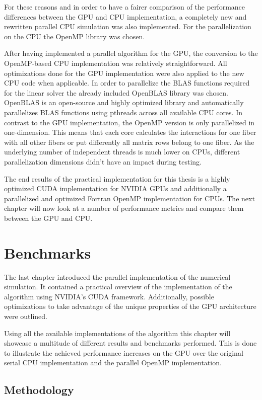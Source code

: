 \documentclass[a4paper,11pt]{kth-mag}
\begin{document}
For these reasons and in order to have a fairer comparison of the performance differences between the GPU and CPU implementation, a completely new and rewritten parallel CPU simulation was also implemented. For the parallelization on the CPU the OpenMP library was chosen.

After having implemented a parallel algorithm for the GPU, the conversion to the OpenMP-based CPU implementation was relatively straightforward. All optimizations done for the GPU implementation were also applied to the new CPU code when applicable. In order to parallelize the BLAS functions required for the linear solver the already included OpenBLAS library was chosen. OpenBLAS is an open-source and highly optimized library and automatically parallelizes BLAS functions using pthreads across all available CPU cores. In contrast to the GPU implementation, the OpenMP version is only parallelized in one-dimension. This means that each core calculates the interactions for one fiber with all other fibers or put differently all matrix rows belong to one fiber. As the underlying number of independent threads is much lower on CPUs, different parallelization dimensions didn't have an impact during testing.

The end results of the practical implementation for this thesis is a highly optimized CUDA implementation for NVIDIA GPUs and additionally a parallelized and optimized Fortran OpenMP implementation for CPUs. The next chapter will now look at a number of performance metrics and compare them between the GPU and CPU.

\chapter{Benchmarks}
\label{cha:benchmarks}

The last chapter introduced the parallel implementation of the numerical simulation. It contained a practical overview of the implementation of the algorithm using NVIDIA's CUDA framework. Additionally, possible optimizations to take advantage of the unique properties of the GPU architecture were outlined.

Using all the available implementations of the algorithm this chapter will showcase a multitude of different results and benchmarks performed. This is done to illustrate the achieved performance increases on the GPU over the original serial CPU implementation and the parallel OpenMP implementation.

\section{Methodology}
\end{document}
